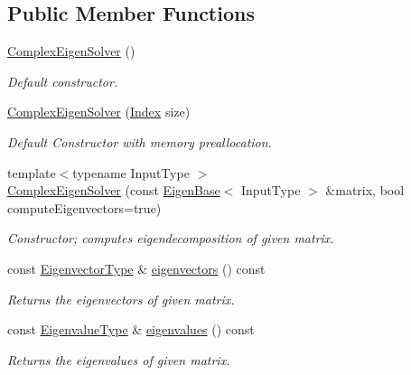 \subsection*{Public Member Functions}
\begin{DoxyCompactItemize}
\item 
\mbox{\hyperlink{class_eigen_1_1_complex_eigen_solver_a3322a21574c61eefd450c003515ad802}{Complex\+Eigen\+Solver}} ()
\begin{DoxyCompactList}\small\item\em Default constructor. \end{DoxyCompactList}\item 
\mbox{\hyperlink{class_eigen_1_1_complex_eigen_solver_a86751f64ebcd5c554551fb5eaaa02db7}{Complex\+Eigen\+Solver}} (\mbox{\hyperlink{class_eigen_1_1_complex_eigen_solver_abc0218d8b902af0d6c759bfc0a8a8d74}{Index}} size)
\begin{DoxyCompactList}\small\item\em Default Constructor with memory preallocation. \end{DoxyCompactList}\item 
{\footnotesize template$<$typename Input\+Type $>$ }\\\mbox{\hyperlink{class_eigen_1_1_complex_eigen_solver_a748de5c1e7f730e16421e6d451437600}{Complex\+Eigen\+Solver}} (const \mbox{\hyperlink{struct_eigen_1_1_eigen_base}{Eigen\+Base}}$<$ Input\+Type $>$ \&matrix, bool compute\+Eigenvectors=true)
\begin{DoxyCompactList}\small\item\em Constructor; computes eigendecomposition of given matrix. \end{DoxyCompactList}\item 
const \mbox{\hyperlink{class_eigen_1_1_complex_eigen_solver_a67cd4d20590abfd86b2639c4c8ea3dd6}{Eigenvector\+Type}} \& \mbox{\hyperlink{class_eigen_1_1_complex_eigen_solver_a3aa5e27800349990778da8fa532c1270}{eigenvectors}} () const
\begin{DoxyCompactList}\small\item\em Returns the eigenvectors of given matrix. \end{DoxyCompactList}\item 
const \mbox{\hyperlink{class_eigen_1_1_complex_eigen_solver_ad3a663b1ff5200a098dabbbf9b7162b1}{Eigenvalue\+Type}} \& \mbox{\hyperlink{class_eigen_1_1_complex_eigen_solver_a10c25c7620e7faedcd39991cce3a757b}{eigenvalues}} () const
\begin{DoxyCompactList}\small\item\em Returns the eigenvalues of given matrix. \end{DoxyCompactList}\item 

\end{DoxyCompactItemize}
